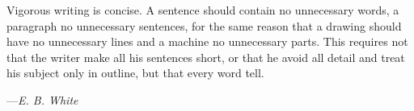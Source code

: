 \documentclass[20pt,a4paper]{article}
\begin{document}
\renewcommand{\epigraphsize}{\small}
\setlength{\epigraphwidth}{1.0\textwidth}

\epigraph
{
    Vigorous writing is concise. A sentence should contain no unnecessary words, a paragraph no unnecessary sentences, for the same reason that a drawing should have no unnecessary lines and a machine no unnecessary parts. This requires not that the writer make all his sentences short, or that he avoid all detail and treat his subject only in outline, but that every word tell.
}
{
    ---\textit{E. B. White}
}
\end{document}
